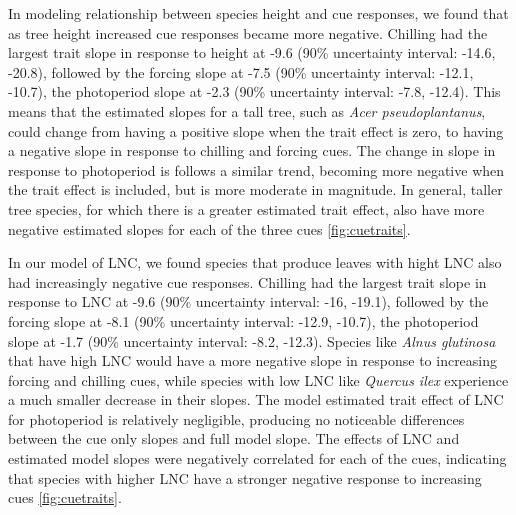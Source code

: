 \documentclass{article}\usepackage[]{graphicx}\usepackage[]{color}
\begin{document}
In modeling relationship between species height and cue responses, we found that as tree height increased cue responses became more negative. Chilling had the largest trait slope in response to height at -9.6 (90\% uncertainty interval: -14.6, -20.8), followed by the forcing slope at -7.5 (90\% uncertainty interval: -12.1, -10.7), the photoperiod slope at -2.3 (90\% uncertainty interval: -7.8, -12.4). This means that the estimated slopes for a tall tree, such as \textit{Acer pseudoplantanus}, could change from having a positive slope when the trait effect is zero, to having a negative slope in response to chilling and forcing cues. The change in slope in response to photoperiod is follows a similar trend, becoming more negative when the trait effect is included, but is more moderate in magnitude. In general, taller tree species, for which there is a greater estimated trait effect,  also have more negative estimated slopes for each of the three cues \ref{fig:cuetraits}. 

In our model of LNC, we found species that produce leaves with hight LNC also had increasingly negative cue responses. Chilling had the largest trait slope in response to LNC at -9.6 (90\% uncertainty interval: -16, -19.1), followed by the forcing slope at -8.1 (90\% uncertainty interval: -12.9, -10.7), the photoperiod slope at -1.7 (90\% uncertainty interval: -8.2, -12.3). Species like \textit{Alnus glutinosa} that have high LNC would have a more negative slope in response to increasing forcing and chilling cues, while species with low LNC like \textit{Quercus ilex} experience a much smaller decrease in their slopes. The model estimated trait effect of LNC for photoperiod is relatively negligible, producing no noticeable differences between the cue only slopes and full model slope.  The effects of LNC and estimated model slopes were negatively correlated for each of the cues, indicating that species with higher LNC have a stronger negative response to increasing cues \ref{fig:cuetraits}. 
\end{document}
